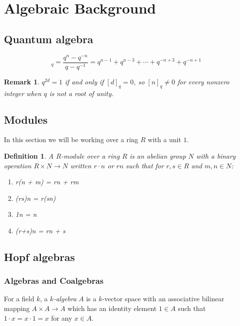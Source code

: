 \documentclass[]{article}
\newtheorem{remark}[theorem]{Remark}
\newtheorem{defn}[theorem]{Definition}
\numberwithin{equation}{subsection}
\begin{document}
\tableofcontents
\section{Algebraic Background}
\subsection{Quantum algebra}

\begin{equation}
    [n]_q = \frac{q^n - q^{-n}}{q - q^{-1}} = q^{n-1} + q^{n-3} + \cdots + q^{-n+3} + q^{-n+1}
\end{equation}

\begin{remark}
$q^{2d}=1$ if and only if $[d]_q = 0$, so $[n]_q \neq 0$ for every nonzero integer when $q$ is not a root of unity. 
\end{remark}


\subsection{Modules}

In  this section we will be working over a ring $R$ with a unit $1$. 
\begin{defn}
    A $R$-\emph{module} over a ring $R$ is an abelian group $N$ with a binary
    operation $R \times N \to N$ written $r\cdot n$ or $rn$ such that for $r,s \in R$ and $m,n \in N$:

    \begin{enumerate}
        \item r(n + m) = rn + rm
        \item (rs)n = r(sn)
        \item 1n = n
        \item (r+s)n = rn + s
    \end{enumerate}
\end{defn}

\subsection{Hopf algebras}
\subsubsection{Algebras and Coalgebras}
For a field $k$, a \emph{$k$-algebra} $A$ is a $k$-vector space with an
associative bilinear mapping $A \times A \to A$ which has an identity element
$1 \in A$ such that $1\cdot x = x\cdot 1 = x$ for any $x \in A$.
\end{document}

